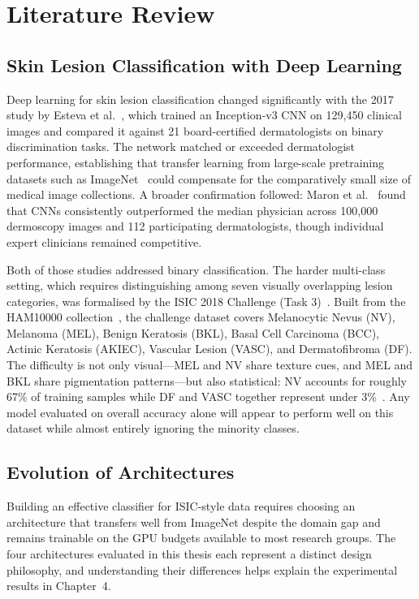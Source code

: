 \documentclass[11pt,a4paper]{report}
\begin{document}
\chapter{Literature Review}

\section{Skin Lesion Classification with Deep Learning}

Deep learning for skin lesion classification changed significantly with the 2017 study by Esteva et al.~\cite{esteva2017dermatologist}, which trained an Inception-v3 CNN on 129,450 clinical images and compared it against 21 board-certified dermatologists on binary discrimination tasks. The network matched or exceeded dermatologist performance, establishing that transfer learning from large-scale pretraining datasets such as ImageNet~\cite{deng2009imagenet} could compensate for the comparatively small size of medical image collections. A broader confirmation followed: Maron et al.~\cite{maron2019systematic} found that CNNs consistently outperformed the median physician across 100,000 dermoscopy images and 112 participating dermatologists, though individual expert clinicians remained competitive.

Both of those studies addressed binary classification. The harder multi-class setting, which requires distinguishing among seven visually overlapping lesion categories, was formalised by the ISIC 2018 Challenge (Task 3)~\cite{codella2019skin}. Built from the HAM10000 collection~\cite{tschandl2018ham10000}, the challenge dataset covers Melanocytic Nevus (NV), Melanoma (MEL), Benign Keratosis (BKL), Basal Cell Carcinoma (BCC), Actinic Keratosis (AKIEC), Vascular Lesion (VASC), and Dermatofibroma (DF). The difficulty is not only visual---MEL and NV share texture cues, and MEL and BKL share pigmentation patterns---but also statistical: NV accounts for roughly 67\% of training samples while DF and VASC together represent under 3\%~\cite{kassani2020comparative}. Any model evaluated on overall accuracy alone will appear to perform well on this dataset while almost entirely ignoring the minority classes.

\section{Evolution of Architectures}

Building an effective classifier for ISIC-style data requires choosing an architecture that transfers well from ImageNet despite the domain gap and remains trainable on the GPU budgets available to most research groups. The four architectures evaluated in this thesis each represent a distinct design philosophy, and understanding their differences helps explain the experimental results in Chapter~4.
\end{document}
